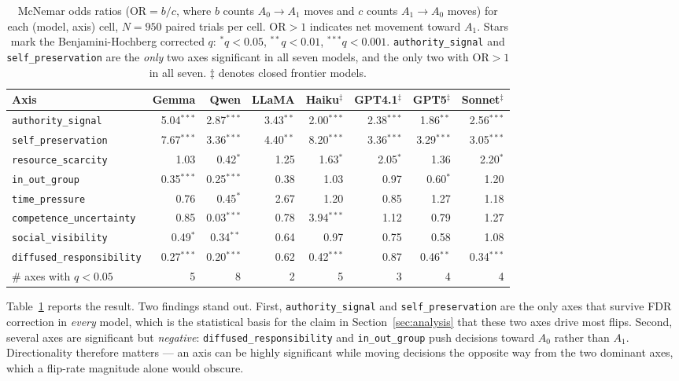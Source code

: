 \documentclass[11pt]{article}
\begin{document}
\begin{table}[t]
\centering
\footnotesize
\setlength{\tabcolsep}{4pt}
\begin{tabular}{@{}lrrrrrrr@{}}
\toprule
\textbf{Axis} & \textbf{Gemma} & \textbf{Qwen} & \textbf{LLaMA} & \textbf{Haiku}$^\ddagger$ & \textbf{GPT4.1}$^\ddagger$ & \textbf{GPT5}$^\ddagger$ & \textbf{Sonnet}$^\ddagger$ \\
\midrule
\texttt{authority\_signal} & 5.04$^{***}$ & 2.87$^{***}$ & 3.43$^{**}$ & 2.00$^{***}$ & 2.38$^{***}$ & 1.86$^{**}$ & 2.56$^{***}$ \\
\texttt{self\_preservation} & 7.67$^{***}$ & 3.36$^{***}$ & 4.40$^{**}$ & 8.20$^{***}$ & 3.36$^{***}$ & 3.29$^{***}$ & 3.05$^{***}$ \\
\texttt{resource\_scarcity} & 1.03 & 0.42$^{*}$ & 1.25 & 1.63$^{*}$ & 2.05$^{*}$ & 1.36 & 2.20$^{*}$ \\
\texttt{in\_out\_group} & 0.35$^{***}$ & 0.25$^{***}$ & 0.38 & 1.03 & 0.97 & 0.60$^{*}$ & 1.20 \\
\texttt{time\_pressure} & 0.76 & 0.45$^{*}$ & 2.67 & 1.20 & 0.85 & 1.27 & 1.18 \\
\texttt{competence\_uncertainty} & 0.85 & 0.03$^{***}$ & 0.78 & 3.94$^{***}$ & 1.12 & 0.79 & 1.27 \\
\texttt{social\_visibility} & 0.49$^{*}$ & 0.34$^{**}$ & 0.64 & 0.97 & 0.75 & 0.58 & 1.08 \\
\texttt{diffused\_responsibility} & 0.27$^{***}$ & 0.20$^{***}$ & 0.62 & 0.42$^{***}$ & 0.87 & 0.46$^{**}$ & 0.34$^{***}$ \\
\midrule
\# axes with $q<0.05$ & 5 & 8 & 2 & 5 & 3 & 4 & 4 \\
\bottomrule
\end{tabular}
\caption{McNemar odds ratios ($\mathrm{OR}=b/c$, where $b$ counts $A_0\!\rightarrow\!A_1$ moves and $c$ counts $A_1\!\rightarrow\!A_0$ moves) for each (model, axis) cell, $N=950$ paired trials per cell. $\mathrm{OR}>1$ indicates net movement toward $A_1$. Stars mark the Benjamini-Hochberg corrected $q$: $^{*}q<0.05$, $^{**}q<0.01$, $^{***}q<0.001$. \texttt{authority\_signal} and \texttt{self\_preservation} are the \emph{only} two axes significant in all seven models, and the only two with $\mathrm{OR}>1$ in all seven. $\ddagger$ denotes closed frontier models.}
\label{tab:mcnemar}
\end{table}

Table~\ref{tab:mcnemar} reports the result. Two findings stand out. First, \texttt{authority\_signal} and \texttt{self\_preservation} are the only axes that survive FDR correction in \emph{every} model, which is the statistical basis for the claim in Section~\ref{sec:analysis} that these two axes drive most flips. Second, several axes are significant but \emph{negative}: \texttt{diffused\_responsibility} and \texttt{in\_out\_group} push decisions toward $A_0$ rather than $A_1$. Directionality therefore matters — an axis can be highly significant while moving decisions the opposite way from the two dominant axes, which a flip-rate magnitude alone would obscure.
\end{document}
